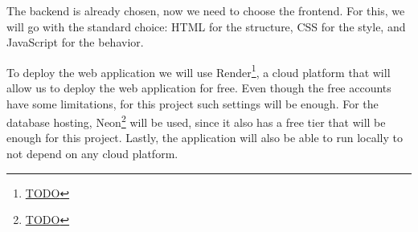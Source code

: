 The backend is already chosen, now we need to choose the frontend. For this, we will go with the standard choice: HTML for the structure, CSS for the style, and JavaScript for the behavior.

To deploy the web application we will use Render\footnote{\url{TODO}}, a cloud platform that will allow us to deploy the web application for free. Even though the free accounts have some limitations, for this project such settings will be enough. For the database hosting, Neon\footnote{\url{TODO}} will be used, since it also has a free tier that will be enough for this project. Lastly, the application will also be able to run locally to not depend on any cloud platform.
